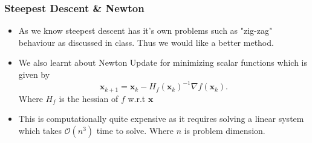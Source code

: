 \documentclass{beamer}
\begin{document}
\begin{frame}[t]
	\frametitle{Steepest Descent \& Newton}
	\begin{itemize}
		\item As we know steepest descent has it's own problems such as "zig-zag" behaviour as discussed in class. Thus we would like a better method.
		\item We also learnt about Newton Update for minimizing scalar functions which is given by
		      \[
			      \bm x_{k+1} = \bm x_k - H_f(\bm x_k)^{-1}\nabla f(\bm x_k)
			      .\]
		      Where $H_f$ is the hessian of  $f$ w.r.t  $\bm x$
		\item This is computationally quite expensive as it requires solving a linear system which takes $\mathcal O (n^3)$ time to solve. Where $n$ is problem dimension.
	\end{itemize}

\end{frame}
\end{document}
